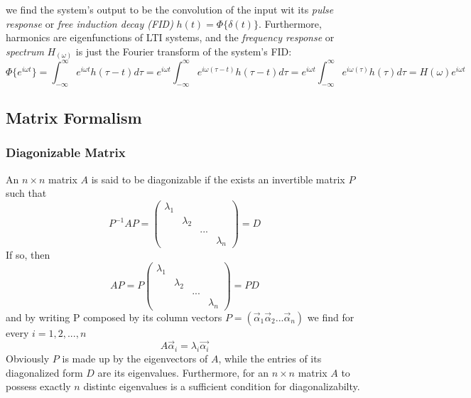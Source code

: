 \documentclass[11.5pt,a4paper]{article}
\begin{document}
we find the system's output to be the convolution of the input wit its \emph{pulse response} or \emph{free induction decay (FID)} $h(t) = \Phi\{\delta(t)\}$. 
Furthermore, harmonics are eigenfunctions of LTI systems, and the \emph{frequency response} or \emph{spectrum} $H_(\omega)$ is just the Fourier transform of the system's FID:
\begin{equation}
	\Phi\{e^{i\omega t}\} = \int_{-\infty}^{\infty} e^{i\omega t} h(\tau-t) d\tau =  e^{i\omega t} \int_{-\infty}^{\infty} e^{i\omega (\tau-t)} h(\tau-t) d\tau =  e^{i\omega t} \int_{-\infty}^{\infty} e^{i\omega (\tau)} h(\tau) d\tau = H(\omega) e^{i \omega t}
\end{equation}

\subsection{Matrix Formalism}

\subsubsection{Diagonizable Matrix}
An $n \times n$ matrix $A$ is said to be diagonizable if the exists an invertible matrix $P$ such that
\begin{equation}
 P^{-1} A P = \begin{pmatrix} 
		\lambda_1 & & & \\
		& \lambda_2 & & \\
		& & \text{...} & \\
		& & & \lambda_n
              \end{pmatrix} = D
\end{equation}
If so, then 
\begin{equation}
 A P = P \begin{pmatrix} 
		\lambda_1 & & & \\
		& \lambda_2 & & \\
		& & \text{...} & \\
		& & & \lambda_n
              \end{pmatrix} = P D
\end{equation}
and by writing P composed by its column vectors $P = ( \vec{\alpha}_1 \vec{\alpha}_2 ... \vec{\alpha}_n)$ we find for every $i = 1,2,...,n$
\begin{equation}
 A \vec{\alpha}_i = \lambda_i \vec{\alpha_i}
\end{equation}
Obviously $P$ is made up by the eigenvectors of $A$, while the entries of its diagonalized form $D$ are its eigenvalues. Furthermore, for an $n \times n$ matrix $A$ to possess exactly $n$ distintc eigenvalues is a sufficient condition for diagonalizabilty.
\end{document}
